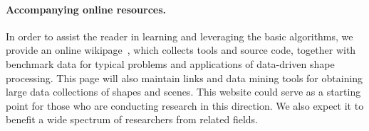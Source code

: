 \paragraph*{Accompanying online resources.}
In order to assist the reader in learning and leveraging the basic algorithms, we provide an online wikipage~\cite{Wikipage}, which collects tools and source code, together with benchmark data for typical problems and applications of data-driven shape processing. This page will also maintain links and data mining tools for obtaining large data collections of shapes and scenes. This website could serve as a starting point for those who are conducting research in this direction. We also expect it to benefit a wide spectrum of researchers from related fields.


